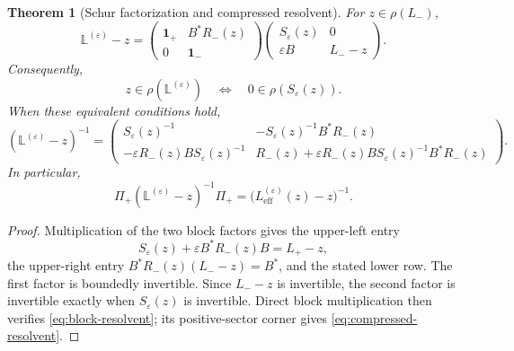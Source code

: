 \documentclass[11pt,reqno]{scrartcl}
\newcommand{\Pp}{\Pi_{+}}
\newcommand{\idop}{\mathbf 1}
\theoremstyle{plain}
\newtheorem{theorem}{Theorem}[section]
\theoremstyle{definition}
\theoremstyle{remark}
\begin{document}
\begin{theorem}[Schur factorization and compressed resolvent]
\label{thm:Schur-factorization}
For \(z\in\rho(L_-)\),
\begin{equation}
  \mathbb L^{(\varepsilon)}-z
  =
  \begin{pmatrix}
    \idop_+&B^*R_-(z)\\
    0&\idop_-
  \end{pmatrix}
  \begin{pmatrix}
    S_\varepsilon(z)&0\\
    \varepsilon B&L_--z
  \end{pmatrix}.
  \label{eq:Schur-factorization}
\end{equation}
Consequently,
\begin{equation}
  z\in\rho(\mathbb L^{(\varepsilon)})
  \quad\Longleftrightarrow\quad
  0\in\rho(S_\varepsilon(z)).
  \label{eq:Schur-invertibility}
\end{equation}
When these equivalent conditions hold,
\begin{equation}
  (\mathbb L^{(\varepsilon)}-z)^{-1}
  =
  \begin{pmatrix}
    S_\varepsilon(z)^{-1}
    &-S_\varepsilon(z)^{-1}B^*R_-(z)\\[2mm]
    -\varepsilon R_-(z)B S_\varepsilon(z)^{-1}
    &R_-(z)+\varepsilon R_-(z)B S_\varepsilon(z)^{-1}B^*R_-(z)
  \end{pmatrix}.
  \label{eq:block-resolvent}
\end{equation}
In particular,
\begin{equation}
  \boxed{
  \Pp(\mathbb L^{(\varepsilon)}-z)^{-1}\Pp
  =\bigl(L_{\mathrm{eff}}^{(\varepsilon)}(z)-z\bigr)^{-1}.}
  \label{eq:compressed-resolvent}
\end{equation}
\end{theorem}

\begin{proof}
Multiplication of the two block factors gives the upper-left entry
\begin{equation}
  S_\varepsilon(z)+\varepsilon B^*R_-(z)B=L_+-z,
\end{equation}
the upper-right entry \(B^*R_-(z)(L_--z)=B^*\), and the stated lower row.
The first factor is boundedly invertible.  Since \(L_--z\) is invertible, the
second factor is invertible exactly when \(S_\varepsilon(z)\) is invertible.  Direct
block multiplication then verifies \eqref{eq:block-resolvent}; its
positive-sector corner gives \eqref{eq:compressed-resolvent}.
\end{proof}
\end{document}
